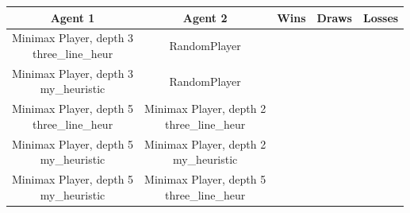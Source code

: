 \documentclass[12pt]{article}
\begin{document}
\begin{enumerate}
	\begin{tabular}{|c|c|c|c|c|}
	\hline
 	Agent 1 & Agent 2 & Wins & Draws & Losses \\
	\hline
	\makecell{Minimax Player, depth 3 \\ three\_line\_heur} & RandomPlayer & & & \\
	\hline
	\makecell{Minimax Player, depth 3 \\ my\_heuristic} & RandomPlayer & & & \\
	\hline
	\makecell{Minimax Player, depth 5 \\ three\_line\_heur} & \makecell{Minimax Player, depth 2 \\ three\_line\_heur} & & & \\
	\hline
 	\makecell{Minimax Player, depth 5 \\ my\_heuristic} & \makecell{Minimax Player, depth 2 \\ my\_heuristic} & & & \\
	\hline
	\makecell{Minimax Player, depth 5 \\ my\_heuristic} & \makecell{Minimax Player, depth 5 \\ three\_line\_heur} & & & \\
	\hline
	\end{tabular}

\end{enumerate}

\newpage
\end{document}
